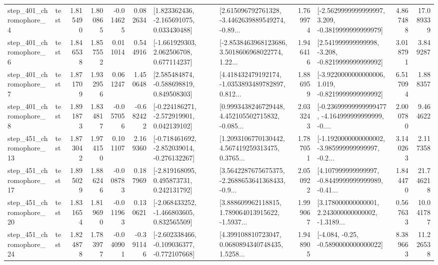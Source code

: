 \begin{tabular}{llrrrrllrlrr}
   step\_401\_chromophore\_4 &      test &      1.815490 &    1.800865 &     -0.014625 &  0.082634 &    [1.823362436, -2.165691075, 0.033430488] &  [2.615096792761328, -3.4462639889549274, -0.89... &       1.769974 &  [-2.5629999999999997, 3.209, -0.3819999999999979] &            4.867488 &         17.089339 \\
   step\_401\_chromophore\_6 &      test &      1.846538 &    1.857552 &      0.011014 &  0.544916 &    [-1.661929303, 2.062506708, 0.677114237] &  [-2.8538463968123686, 3.5018606968022774, 1.22... &       1.946416 &   [2.541999999999998, -3.208, -0.8219999999999992] &            3.018791 &          3.849287 \\
   step\_401\_chromophore\_7 &      test &      1.871709 &    1.932956 &      0.061247 &  1.450648 &    [2.585484874, -0.588698819, 0.849508303] &  [4.418432479192174, -1.0353893489782897, 0.812... &       1.886959 &  [-3.9220000000000006, 1.019, -0.8219999999999992] &            6.517094 &          1.888357 \\
   step\_401\_chromophore\_8 &      test &      1.891873 &    1.834817 &     -0.057056 & -0.682422 &   [-0.224186271, -2.572919901, 0.042139102] &  [0.9993438246729448, 4.452105502715832, -0.085... &       2.033243 &  [-0.23699999999999477, -4.164999999999999, -0.... &            2.000780 &          9.464622 \\
  step\_451\_chromophore\_13 &      test &      1.873042 &    1.974150 &      0.101107 &  2.169360 &  [-0.718461692, -2.852039014, -0.276132267] &  [1.2093106770130442, 4.567419259313475, 0.3765... &       1.787051 &  [-1.1920000000000002, -3.985999999999997, -0.2... &            3.140263 &          2.117358 \\
  step\_451\_chromophore\_17 &      test &      1.895029 &    1.886246 &     -0.008783 &  0.187969 &    [-2.819168095, 0.495873731, 0.242131792] &  [3.5642287675675375, -2.2688653641368433, -0.9... &       2.050922 &  [4.107999999999997, -0.8449999999999989, -0.41... &            1.844470 &         21.746218 \\
  step\_451\_chromophore\_20 &      test &      1.831654 &    1.819690 &     -0.011963 &  0.130621 &   [-2.068433252, -1.466803605, 0.832565509] &  [3.888609962118815, 1.789064013915622, -1.5937... &       1.999067 &  [3.178000000000001, 2.243000000000002, -1.3189... &            0.567633 &         10.041787 \\
  step\_451\_chromophore\_24 &      test &      1.824878 &    1.783977 &     -0.040901 & -0.391146 &  [-2.602338466, -0.109036377, -0.772107668] &  [4.399108810723047, 0.0680894340748435, 1.5258... &       1.948905 &               [-4.084, -0.25, -0.5890000000000022] &            8.389663 &         11.226538 \\

\end{tabular}
